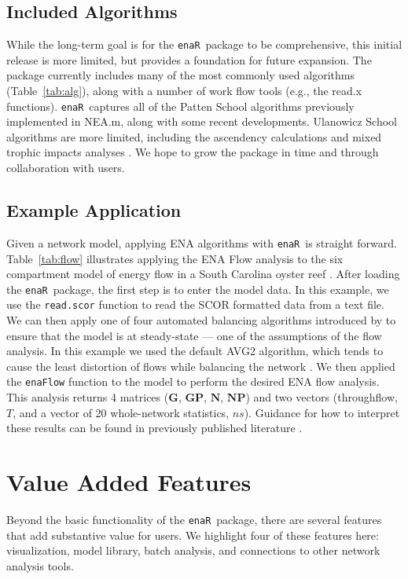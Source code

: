 \documentclass[11pt]{article}
\newcommand{\enaR}{\texttt{enaR}}
\begin{document}
\begin{spacing}{2}
\subsection{Included Algorithms}
While the long-term goal is for the \enaR\ package to be
comprehensive, this initial release is more limited, but provides a
foundation for future expansion. The package currently includes many
of the most commonly used algorithms (Table~\ref{tab:alg}), along with
a number of work flow tools (e.g., the read.x functions).
\enaR\ captures all of the Patten School algorithms previously
implemented in NEA.m, along with some recent developments.  Ulanowicz
School algorithms are more limited, including the ascendency
calculations \citep{ulanowicz97} and mixed trophic impacts analyses
\citep{ulanowicz90}.  We hope to grow the package in time and through
collaboration with users.

\subsection{Example Application}
Given a network model, applying ENA algorithms with \enaR\ is straight
forward.  Table~\ref{tab:flow} illustrates applying the ENA Flow
analysis to the six compartment model of energy flow in a South
Carolina oyster reef \citep{dame81}.  After loading the \enaR\
package, the first step is to enter the model data.  In this example,
we use the \texttt{read.scor} function to read the SCOR formatted data
from a text file.  We can then apply one of four automated balancing
algorithms introduced by \citet[AVG, Input-Output, Output-Input,
AVG2,][]{allesina03} to ensure that the model is at steady-state ---
one of the assumptions of the flow analysis.  In this example we used
the default AVG2 algorithm, which tends to cause the least distortion
of flows while balancing the network \citep{allesina03}.  We then
applied the \texttt{enaFlow} function to the model to perform the
desired ENA flow analysis.  This analysis returns 4 matrices
($\mathbf{G}$, $\mathbf{GP}$, $\mathbf{N}$, $\mathbf{NP}$) and two
vectors (throughflow, $T$, and a vector of 20 whole-network statistics,
$ns$).  Guidance for how to interpret these results can be found in
previously published literature \citep{fath06, schramski11}.

\section{Value Added Features}
Beyond the basic functionality of the \enaR\ package, there are
several features that add substantive value for users.  We highlight
four of these features here: visualization, model library, batch
analysis, and connections to other network analysis tools.


\end{spacing}
\end{document}

